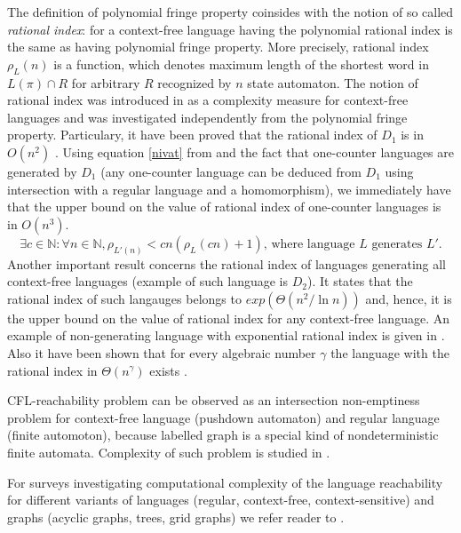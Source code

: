 \documentclass[smallextended]{svjour3}       %
\begin{document}
The definition of polynomial fringe property coinsides with the notion of so called \textit{rational index}: for a context-free language having the polynomial rational index is the same as having polynomial fringe property. More precisely, rational index $\rho_L(n)$ is a function, which denotes maximum length of the shortest word in $L(\pi) \cap R$ for arbitrary $R$ recognized by $n$ state automaton. The notion of rational index was introduced in \cite{RatBasic} as a complexity measure for context-free languages and was investigated independently from the polynomial fringe property.  Particulary, it have been proved that the rational index of $D_1$ is in $O( n^2)$ \cite{Dyck1}. Using equation \ref{nivat} from \cite{RatBasic} and the fact that one-counter languages are generated by $D_1$ (any one-counter language can be deduced from $D_1$ using intersection with a regular language and a homomorphism), we immediately have that the upper bound on the value of rational index of one-counter languages is in $O(n^3)$.
\begin{equation}
\label{nivat}
\exists c \in \mathbb{N}:\forall  n \in  \mathbb{N}, \rho_{L'(n)} < cn(\rho_L(cn) + 1) \text{, where language $L$ generates $L'$.}
\end{equation}
Another important result concerns the rational index of languages generating all context-free languages (example of such language is $D_2$). It states that the rational index of such langauges belongs to $exp(\Theta(n^2/\ln n))$ \cite{CFRat} and, hence, it is the upper bound on the value of rational index for any context-free language. An example of non-generating language with exponential rational index is given in \cite{Regularrealizability}. Also it have been shown that for every algebraic number $\gamma $ the language with the rational index in $\Theta (n^\gamma )$ exists \cite{GreibRat}. 


CFL-reachability problem can be observed as an intersection non-emptiness problem for context-free language (pushdown automaton) and regular language (finite automoton), because labelled graph is a special kind of nondeterministic finite automata. Complexity of such problem is studied in \cite*{ ganardi2016circuit, Intersection, VyalyiRR}.


For surveys investigating computational complexity of the language reachability for different variants of languages (regular, context-free, context-sensitive) and graphs (acyclic graphs, trees, grid graphs) we refer reader to \cite*{Barrett, LabelledGraphs, LReach}. 
\end{document}
